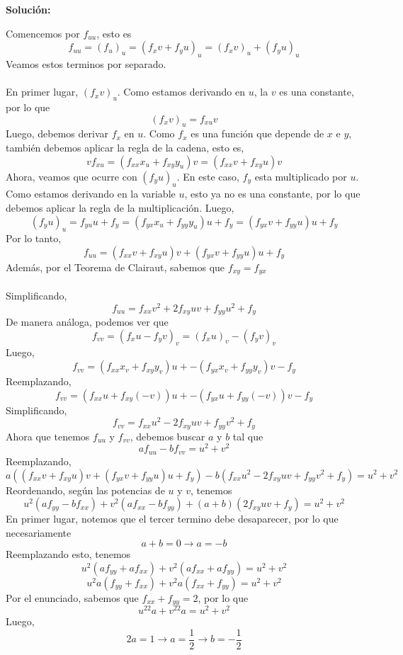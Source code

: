 \documentclass[12pt]{article}
\newenvironment{solucion}
{\begin{mdframed}[backgroundcolor=black!10]
		{\bf Solución:}\\
	}
	{
	\end{mdframed}
}
\newenvironment{preguntas}
{\begin{enumerate}\itemsep12pt
	}
	{
	\end{enumerate}
}
\newcommand{\ra}{\rightarrow}
\begin{document}
\begin{preguntas}
\begin{solucion}
\begin{enumerate}[a)]
Comencemos por $f_{uu}$, esto es
$$f_{uu} = (f_u)_u = (f_x v + f_y u)_u =(f_x v)_u + (f_y u)_u$$
Veamos estos terminos por separado.\\
\\
En primer lugar, $(f_x v)_u$. Como estamos derivando en $u$, la $v$ es una constante, por lo que
$$(f_x v)_u = f_{xu}v$$
Luego, debemos derivar $f_x$ en $u$. Como $f_x$ es una función que depende de $x$ e $y$, también debemos aplicar la regla de la cadena, esto es,
$$v f_{xu} = (f_{xx} x_u + f_{xy} y_u)v = (f_{xx} v + f_{xy} u)v $$
Ahora, veamos que ocurre con $(f_y u)_u$. En este caso, $f_y$ esta multiplicado por $u$. Como estamos derivando en la variable $u$, esto ya no es una constante, por lo que debemos aplicar la regla de la multiplicación. Luego,
$$(f_y u)_u =  f_{yu}u + f_y = (f_{yx} x_u + f_{yy} y_u)u + f_y =  (f_{yx} v + f_{yy} u)u + f_y$$
Por lo tanto,
$$f_{uu} = (f_{xx} v + f_{xy} u)v + (f_{yx} v + f_{yy} u)u + f_y$$
Además, por el Teorema de Clairaut, sabemos que $f_{xy} = f_{yx}$\\
\\
Simplificando,
$$f_{uu} = f_{xx}v^2 + 2f_{xy}uv + f_{yy}u^2+ f_y$$
De manera análoga, podemos ver que
$$f_{vv} = (f_x u - f_y v)_v = (f_x u)_v - (f_y v)_v$$
Luego,
$$f_{vv} = (f_{xx}x_v + f_{xy} y_v)u + - (f_{yx} x_v + f_{yy} y_v)v - f_y$$
Reemplazando,
$$f_{vv} = (f_{xx}u + f_{xy} (-v))u + - (f_{yx} u + f_{yy} (-v))v - f_y$$
Simplificando,
$$f_{vv} = f_{xx}u^2 - 2f_{xy}uv + f_{yy}v^2 + f_y$$
Ahora que tenemos $f_{uu}$ y $f_{vv}$, debemos buscar $a$ y $b$ tal que
$$af_{uu} - bf_{vv} = u^2 + v^2$$
Reemplazando,
$$a((f_{xx} v + f_{xy} u)v + (f_{yx} v + f_{yy} u)u + f_y) - b (f_{xx}u^2 - 2f_{xy}uv + f_{yy}v^2 + f_y) = u^2 + v^2$$
Reordenando, según las potencias de $u$ y $v$, tenemos
$$u^2(af_{yy} - bf_{xx}) + v^2(af_{xx} - bf_{yy}) + (a+b)(2f_{xy}uv + f_y) = u^2 + v^2$$
En primer lugar, notemos que el tercer termino debe desaparecer, por lo que necesariamente
$$a + b = 0 \ra a = -b$$
Reemplazando esto, tenemos
$$u^2(af_{yy} +af_{xx}) + v^2(af_{xx} +af_{yy}) = u^2 + v^2$$
$$u^2a(f_{yy} +f_{xx}) + v^2a(f_{xx} +f_{yy}) = u^2 + v^2$$
Por el enunciado, sabemos que $f_{xx} + f_{yy} = 2$, por lo que
$$u^22a + v^22a = u^2 + v^2$$
Luego,
$$2a = 1 \ra a = \dfrac{1}{2} \ra b = -\dfrac{1}{2}$$
\end{enumerate}
\end{solucion}
\end{preguntas}
\end{document}
